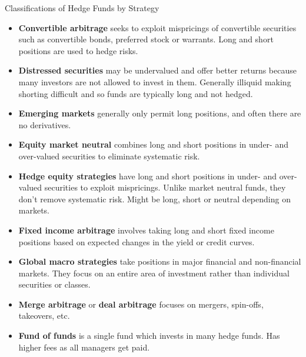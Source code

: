 \documentclass[../custom,grid]{flashcards}
\begin{document}
\begin{flashcard}{Classifications of Hedge Funds by Strategy}
    \begin{itemize}
        \item \textbf{Convertible arbitrage} seeks to exploit mispricings of convertible securities such as convertible bonds, preferred stock or warrants. Long and short positions are used to hedge risks.
        \item \textbf{Distressed securities} may be undervalued and offer better returns because many investors are not allowed to invest in them. Generally illiquid making shorting difficult and so funds are typically long and not hedged.
        \item \textbf{Emerging markets} generally only permit long positions, and often there are no derivatives.
        \item \textbf{Equity market neutral} combines long and short positions in under- and over-valued securities to eliminate systematic risk.
        \item \textbf{Hedge equity strategies} have long and short positions in under- and over-valued securities to exploit mispricings. Unlike market neutral funds, they don't remove systematic risk. Might be long, short or neutral depending on markets.
        \item \textbf{Fixed income arbitrage} involves taking long and short fixed income positions based on expected changes in the yield or credit curves.
        \item \textbf{Global macro strategies} take positions in major financial and non-financial markets. They focus on an entire area of investment rather than individual securities or classes.
        \item \textbf{Merge arbitrage} or \textbf{deal arbitrage} focuses on mergers, spin-offs, takeovers, etc.
        \item \textbf{Fund of funds} is a single fund which invests in many hedge funds. Has higher fees as all managers get paid.
    \end{itemize}
\end{flashcard}
\end{document}
